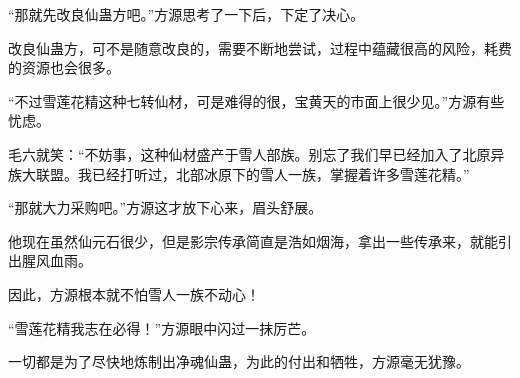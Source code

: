 \begin{this_body}
“那就先改良仙蛊方吧。”方源思考了一下后，下定了决心。

改良仙蛊方，可不是随意改良的，需要不断地尝试，过程中蕴藏很高的风险，耗费的资源也会很多。

“不过雪莲花精这种七转仙材，可是难得的很，宝黄天的市面上很少见。”方源有些忧虑。

毛六就笑：“不妨事，这种仙材盛产于雪人部族。别忘了我们早已经加入了北原异族大联盟。我已经打听过，北部冰原下的雪人一族，掌握着许多雪莲花精。”

“那就大力采购吧。”方源这才放下心来，眉头舒展。

他现在虽然仙元石很少，但是影宗传承简直是浩如烟海，拿出一些传承来，就能引出腥风血雨。

因此，方源根本就不怕雪人一族不动心！

“雪莲花精我志在必得！”方源眼中闪过一抹厉芒。

一切都是为了尽快地炼制出净魂仙蛊，为此的付出和牺牲，方源毫无犹豫。

\end{this_body}

